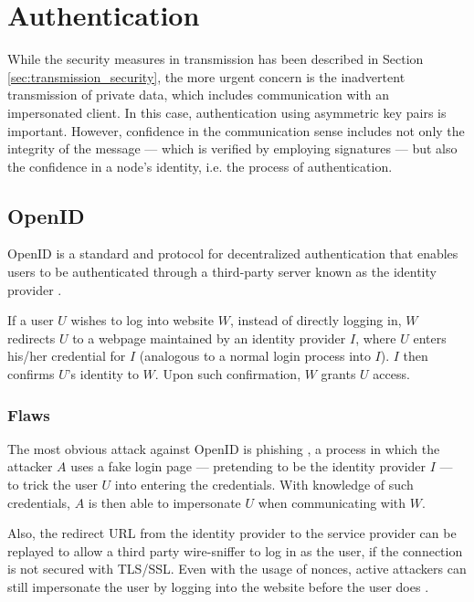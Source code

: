 \documentclass[letterpaper, twocolumn, 10pt, conference]{IEEEtran}
\begin{document}
\section{Authentication} \label{sec:authentication}

While the security measures in transmission has been described in Section \ref{sec:transmission_security}, the more urgent concern is the inadvertent transmission of private data, which includes communication with an impersonated client. In this case, authentication using asymmetric key pairs is important. However, confidence in the communication sense includes not only the integrity of the message --- which is verified by employing signatures --- but also the confidence in a node's identity, i.e. the process of authentication.

\subsection{OpenID} \label{ssec:openid}

OpenID is a standard and protocol for decentralized authentication that enables users to be authenticated through a third-party server known as the identity provider \cite{eldon2019single}. 

If a user $U$ wishes to log into website $W$, instead of directly logging in, $W$ redirects $U$ to a webpage maintained by an identity provider $I$, where $U$ enters his/her credential for $I$ (analogous to a normal login process into $I$). $I$ then confirms $U$'s identity to $W$. Upon such confirmation, $W$ grants $U$ access.

\subsubsection*{Flaws} \label{sssec:openid_flaws}

The most obvious attack against OpenID is phishing \cite{crowley2005phishing}, a process in which the attacker $A$ uses a fake login page --- pretending to be the identity provider $I$ --- to trick the user $U$ into entering the credentials. With knowledge of such credentials, $A$ is then able to impersonate $U$ when communicating with $W$.

Also, the redirect URL from the identity provider to the service provider can be replayed to allow a third party wire-sniffer to log in as the user, if the connection is not secured with TLS/SSL. Even with the usage of nonces, active attackers can still impersonate the user by logging into the website before the user does \cite{tsyrklevich2007single}.
\end{document}

